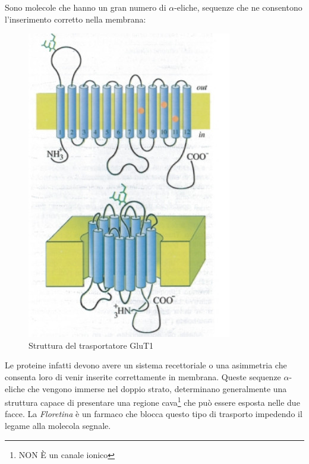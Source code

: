 \documentclass[a4paper,12pt]{article}
\begin{document}
Sono molecole che hanno un gran numero di $\alpha$-eliche, sequenze che ne consentono l'inserimento corretto nella membrana:
\begin{figure}[H]
\centering
\includegraphics[scale=0.3]{immagine/glut1.jpg}
\caption{Struttura del trasportatore GluT1}
\end{figure}

 Le proteine infatti devono avere un sistema recettoriale o una asimmetria che consenta loro di venir inserite correttamente in membrana.
Queste sequenze $\alpha$-eliche che vengono immerse nel doppio strato, determinano generalmente una struttura capace di presentare una regione cava\footnote{NON È un canale ionico} che può
essere esposta nelle due facce. La \emph{Floretina} è un farmaco che blocca questo tipo di trasporto impedendo il legame alla molecola segnale.
\end{document}
